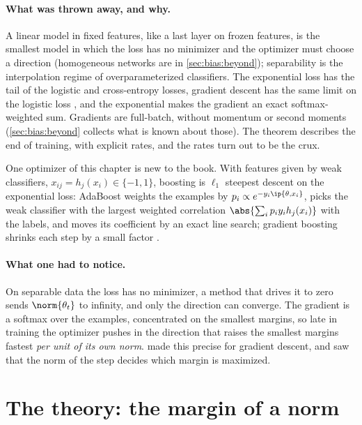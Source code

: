 \begin{refsection}
\paragraph{What was thrown away, and why.} A linear model in fixed features, like a last layer on frozen features, is the smallest model in which the loss has no minimizer and the optimizer must choose a direction (homogeneous networks are in \cref{sec:bias:beyond}); separability is the interpolation regime of overparameterized classifiers. The exponential loss has the tail of the logistic and cross-entropy losses, gradient descent has the same limit on the logistic loss \parencite{SoudryEtAl2018,JiTelgarsky2021}, and the exponential makes the gradient an exact softmax-weighted sum. Gradients are full-batch, without momentum or second moments (\cref{sec:bias:beyond} collects what is known about those). The theorem describes the end of training, with explicit rates, and the rates turn out to be the crux.

One optimizer of this chapter is new to the book. With features given by weak classifiers, $x_{ij}=h_j(x_i)\in\{-1,1\}$, boosting is $\ell_1$ steepest descent on the exponential loss: AdaBoost \parencite{FreundSchapire1997} weights the examples by $p_i\propto e^{-y_i\ip{\theta,x_i}}$, picks the weak classifier with the largest weighted correlation $\abs{\sum_ip_iy_ih_j(x_i)}$ with the labels, and moves its coefficient by an exact line search; gradient boosting shrinks each step by a small factor \parencite{Friedman2001}.

\paragraph{What one had to notice.} On separable data the loss has no minimizer, a method that drives it to zero sends $\norm{\theta_t}$ to infinity, and only the direction can converge. The gradient is a softmax over the examples, concentrated on the smallest margins, so late in training the optimizer pushes in the direction that raises the smallest margins fastest \emph{per unit of its own norm}. \Textcite{SoudryEtAl2018} made this precise for gradient descent, and \textcite{GunasekarEtAl2018} saw that the norm of the step decides which margin is maximized.

\section{The theory: the margin of a norm}\label{sec:bias:theory}


\end{refsection}
